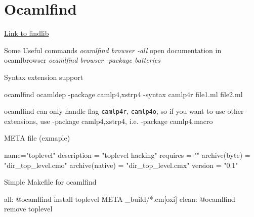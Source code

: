 \section{Ocamlfind}

\href{http://projects.camlcity.org/projects/dl/findlib-1.2.3/doc/ref-html/r17.html}{Link  to findlib}


Some Useful commands
\emph{ocamlfind browser -all } open documentation in ocamlbrowser 
\emph{ocamlfind browser -package batteries}


Syntax extension support  \\

\begin{bluetext}
ocamlfind ocamldep -package camlp4,xstrp4 -syntax camlp4r file1.ml file2.ml 
\end{bluetext}
ocamlfind can only handle flag \verb|camlp4r|, \verb|camlp4o|, so if you want to
use other extensions,  use -package camlp4,xstrp4, i.e. -package camlp4.macro
  


META file (exmaple)
\begin{bluetext}
name="toplevel"
description = "toplevel hacking"
requires = ""
archive(byte) = "dir_top_level.cmo"
archive(native) = "dir_top_level.cmx"
version = "0.1"
\end{bluetext}


Simple Makefile for ocamlfind 
\begin{bluetext}
all:
	   @ocamlfind install toplevel META _build/*.cm[oxi]
clean: 
	   @ocamlfind remove toplevel 
\end{bluetext}

